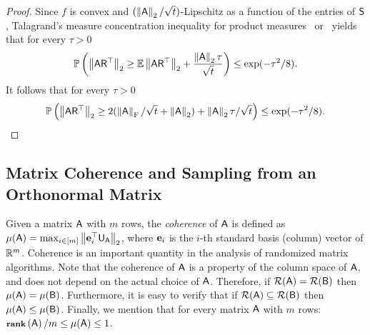 \begin{proof}
Since $f$ is convex and $(\left\|{\mathsf{A} }\right\|_2/\sqrt{t})$-Lipschitz as a function of the entries of ${\mathsf{S} }$, Talagrand's measure concentration inequality for product measures~\cite[Equation~1.8]{talagrand} or~\cite[Theorem~5.9, p. 100]{book:Ledoux} yields that for every $\tau>0$
\begin{equation*}
\mathbb{P}\left( \left\| {\mathsf{A} }{\mathsf{R} }^\top \right\|_2 \geq \operatorname{\mathbb{E}} \left\|{\mathsf{A} } {\mathsf{R} }^\top\right\|_2 + \frac{\left\|{\mathsf{A} }\right\|_2\tau}{\sqrt{t}} \right) \leq \hbox{\textrm exp} (-\tau^2 /8).
\end{equation*}
It follows that for every $\tau>0$
\[\mathbb{P}\left(\left\| {\mathsf{A} }{\mathsf{R} }^\top \right\|_2 \geq  2(\left\|{\mathsf{A} }\right\|_{\textrm{F}}/\sqrt{t} + \left\|{\mathsf{A} }\right\|_2) + \left\|{\mathsf{A} }\right\|_2\tau / \sqrt{t}\right) \leq \hbox{\textrm exp} (-\tau^2 /8).\]
\end{proof}
%
\subsection{Matrix Coherence and Sampling from an Orthonormal Matrix}
%
%
Given a matrix ${\mathsf{A} }$ with $m$ rows, the \emph{coherence} of ${\mathsf{A} }$ is defined as $\mu({\mathsf{A} })=\max_{i\in{[m]}}\left\| {\mathbf e}_i^\top {\ensuremath{\mathsf{U} }}_{{\mathsf{A} }}  \right\|_2$, where ${\mathbf e}_i$ is the $i$-th standard basis (column) vector of $\mathbb{R}^m$. Coherence is an important quantity in the analysis of randomized matrix algorithms. Note that the coherence of ${\mathsf{A} }$ is a property of the column space of ${\mathsf{A} }$, and does not depend on the actual choice of ${\mathsf{A} }$. Therefore, if $\mathcal{R}({\mathsf{A} }) = \mathcal{R}({\mathsf{B} })$ then $\mu({\mathsf{A} }) = \mu({\mathsf{B} })$. Furthermore, it is easy to verify that if $\mathcal{R}({\mathsf{A} }) \subseteq \mathcal{R}({\mathsf{B} })$ then $\mu({\mathsf{A} }) \leq \mu({\mathsf{B} })$. Finally, we mention that for every matrix ${\mathsf{A} }$ with $m$ rows: $\operatorname{\textbf{{\footnotesize rank}}}\left({\mathsf{A} }\right)/m \leq \mu({\mathsf{A} }) \leq 1$.
%

